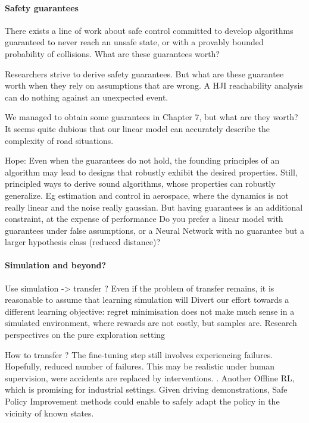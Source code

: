 \paragraph{Safety guarantees}

There exists a line of work about safe control committed to develop algorithms guaranteed to never reach an unsafe state, or with a provably bounded probability of collisions. What are these guarantees worth?

Researchers strive to derive safety guarantees. 
But what are these guarantee worth when they rely on assumptions that are wrong. 
A HJI reachability analysis can do nothing against an unexpected event.

We managed to obtain some guarantees in Chapter 7, but what are they worth? It seems quite dubious that our linear model can accurately describe the complexity of road situations.

Hope: Even when the guarantees do not hold, the founding principles of an algorithm may lead to designs that robustly exhibit the desired properties.
Still, principled ways to derive sound algorithms, whose properties can robustly generalize. Eg estimation and control in aerospace, where the dynamics is not really linear and the noise really gaussian.
But having guarantees is an additional constraint, at the expense of performance
Do you prefer a linear model with guarantees under false assumptions, or a Neural Network with no guarantee but a larger hypothesis class (reduced distance)?

\paragraph{Simulation and beyond?}
Use simulation -> transfer ? Even if the problem of transfer remains, it is reasonable to assume that learning simulation will 
Divert our effort towards a different learning objective: regret minimisation does not make much sense in a simulated environment, where rewards are not costly, but samples are.
Research perspectives on the pure exploration setting

How to transfer ? The fine-tuning step still involves experiencing failures.
Hopefully, reduced number of failures.
This may be realistic under human supervision, were accidents are replaced by interventions. \citep{Saunders2018,Kendall2019}.
Another Offline RL, which is promising for industrial settings. Given driving demonstrations, Safe Policy Improvement methods \citep{Laroche2019} could enable to safely adapt the policy in the vicinity of known states. 
